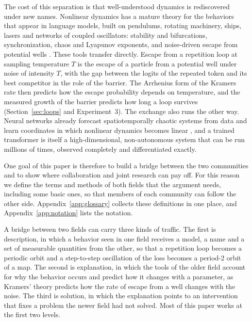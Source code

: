 The cost of this separation is that well-understood dynamics is rediscovered under new names. Nonlinear dynamics has a mature theory for the behaviors that appear in language models, built on pendulums, rotating machinery, ships, lasers and networks of coupled oscillators: stability and bifurcations, synchronization, chaos and Lyapunov exponents, and noise-driven escape from potential wells \citep{strogatz2018nonlinear,kramers1940brownian,hanggi1990reaction,acebron2005kuramoto}. These tools transfer directly. Escape from a repetition loop at sampling temperature $T$ is the escape of a particle from a potential well under noise of intensity $T$, with the gap between the logits of the repeated token and its best competitor in the role of the barrier. The Arrhenius form of the Kramers rate then predicts how the escape probability depends on temperature, and the measured growth of the barrier predicts how long a loop survives (Section~\ref{sec:loops} and Experiment~3). The exchange also runs the other way. Neural networks already forecast spatiotemporally chaotic systems from data \citep{pathak2018model} and learn coordinates in which nonlinear dynamics becomes linear \citep{lusch2017deep}, and a trained transformer is itself a high-dimensional, non-autonomous system that can be run millions of times, observed completely and differentiated exactly.

One goal of this paper is therefore to build a bridge between the two communities and to show where collaboration and joint research can pay off. For this reason we define the terms and methods of both fields that the argument needs, including some basic ones, so that members of each community can follow the other side. Appendix~\ref{app:glossary} collects these definitions in one place, and Appendix~\ref{app:notation} lists the notation.

A bridge between two fields can carry three kinds of traffic. The first is description, in which a behavior seen in one field receives a model, a name and a set of measurable quantities from the other, so that a repetition loop becomes a periodic orbit and a step-to-step oscillation of the loss becomes a period-2 orbit of a map. The second is explanation, in which the tools of the older field account for why the behavior occurs and predict how it changes with a parameter, as Kramers' theory predicts how the rate of escape from a well changes with the noise. The third is solution, in which the explanation points to an intervention that fixes a problem the newer field had not solved. Most of this paper works at the first two levels.

